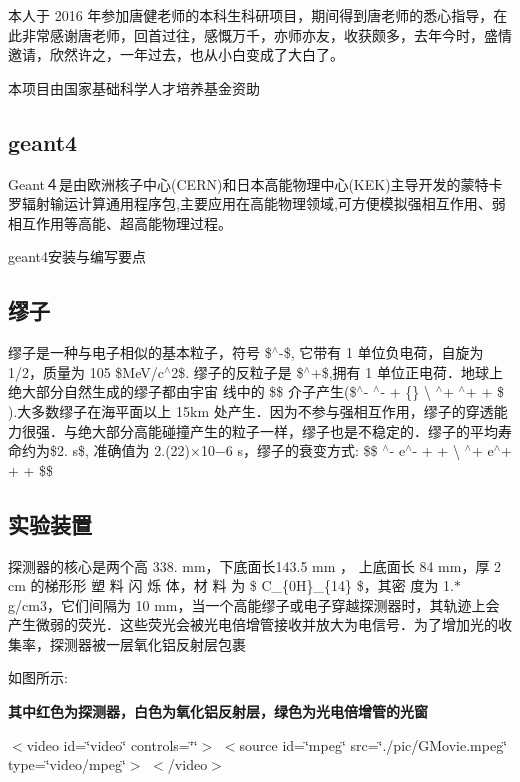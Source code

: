 本人于 2016 年参加唐健老师的本科生科研项目，期间得到唐老师的悉心指导，在此非常感谢唐老师，回首过往，感慨万千，亦师亦友，收获颇多，去年今时，盛情邀请，欣然许之，一年过去，也从小白变成了大白了。

本项目由国家基础科学人才培养基金资助 \subsection*{geant4}

Geant４是由欧洲核子中心(\+C\+E\+R\+N)和日本高能物理中心(\+K\+E\+K)主导开发的蒙特卡罗辐射输运计算通用程序包,主要应用在高能物理领域,可方便模拟强相互作用、弱相互作用等高能、超高能物理过程。

geant4安装与编写要点 \subsection*{缪子}

缪子是一种与电子相似的基本粒子，符号 \$$^\wedge$-\/\$, 它带有 1 单位负电荷，自旋为 1/2，质量为 105 \$\+MeV/c$^\wedge$2\$. 缪子的反粒子是 \$$^\wedge$+\$,拥有 1 单位正电荷．地球上绝大部分自然生成的缪子都由宇宙 线中的 \$\$ 介子产生(\$$^\wedge$-\/  $^\wedge$-\/ + \{\} \textbackslash{} $^\wedge$+ $^\wedge$+ + \$ ).大多数缪子在海平面以上 15km 处产生．因为不参与强相互作用，缪子的穿透能力很强．与绝大部分高能碰撞产生的粒子一样，缪子也是不稳定的．缪子的平均寿命约为\$2. s\$, 准确值为 2.(22)×10−6 s，缪子的衰变方式\+: \$\$ $^\wedge$-\/  e$^\wedge$-\/ +  + \textbackslash{} $^\wedge$+  e$^\wedge$+ +  +  \$\$ \subsection*{实验装置}

探测器的核心是两个高 338. mm，下底面长143.5 mm ， 上底面长 84 mm，厚 2 cm 的梯形形 塑 料 闪 烁 体，材 料 为 \$ C\+\_\{0H\}\+\_\+\{14\} \$，其密 度为 1.$\ast$g/cm3，它们间隔为 10 mm，当一个高能缪子或电子穿越探测器时，其轨迹上会产生微弱的荧光．这些荧光会被光电倍增管接收并放大为电信号．为了增加光的收集率，探测器被一层氧化铝反射层包裹

如图所示\+: 

{\bfseries 其中红色为探测器，白色为氧化铝反射层，绿色为光电倍增管的光窗}

$<$video id=\char`\"{}video\char`\"{} controls=\char`\"{}\char`\"{}$>$ $<$source id=\char`\"{}mpeg\char`\"{} src=\char`\"{}./pic/\+G\+Movie.\+mpeg\char`\"{} type=\char`\"{}video/mpeg\char`\"{}$>$ $<$/video$>$

